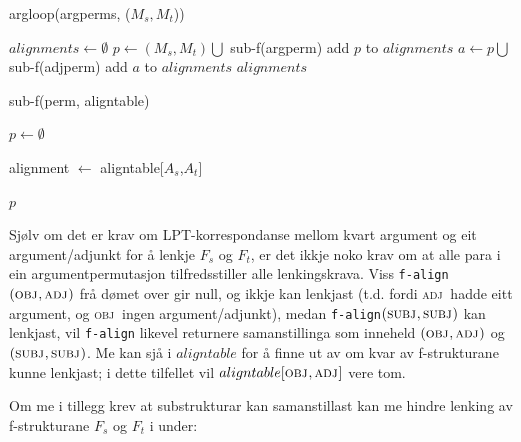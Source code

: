 \documentclass[12pt,a4paper,oneside,draft]{report}
\newcommand{\F}[2]{\textsc{#1}\ensuremath{_{#2}}}
\newcommand{\OBJ}{\F{obj}{}}
\newcommand{\OBJs}{\F{obj~}{}}
\newcommand{\ADJ}{\F{adj}{}}
\newcommand{\ADJs}{\F{adj~}{}}
\newcommand{\SUBJ}{\F{subj}{}}
\begin{document}
  \begin{algorithm}[htbp]
    \caption{argloop(argperms, ($M_s,M_t$))}
    \label{algo:argloop}

    $alignments \gets \emptyset$  \;
     {
       {
        $p \gets (M_s,M_t) \bigcup$ sub-f(argperm)
        add $p$ to $alignments$ \;
         {
          $a \gets p \bigcup$ sub-f(adjperm)  
          add $a$ to $alignments$\;
        } %
      } %
    }
    \Return $alignments$
  \end{algorithm}    
  
  \begin{algorithm}[htbp]
    \caption{sub-f(perm, aligntable)}
    \label{algo:sub-f}
    
    $p \gets \emptyset$  \;
         {
           {
            alignment $\gets$ aligntable[$A_s$,$A_t$] \;
          }
          
        }
    \Return $p$
  \end{algorithm}    

Sjølv om det er krav om LPT\hyp{}korrespondanse mellom kvart argument og
eit argument/adjunkt for å lenkje $F_s$ og $F_t$, er det ikkje noko
krav om at alle para i ein argumentpermutasjon tilfredsstiller alle
lenkingskrava. Viss \texttt{f-align}$(\OBJ,\ADJ)$ frå dømet over gir
null, og ikkje kan lenkjast (t.d. fordi \ADJs hadde eitt argument, og
\OBJs ingen argument/adjunkt), medan \texttt{f-align}$(\SUBJ,\SUBJ)$
kan lenkjast, vil \texttt{f-align} likevel returnere samanstillinga som
inneheld $(\OBJ,\ADJ)$ og $(\SUBJ,\SUBJ)$. Me kan sjå i $aligntable$
for å finne ut av om kvar av f\hyp{}strukturane kunne lenkjast; i dette
tilfellet vil $aligntable[\OBJ,\ADJ]$ vere tom.



Om me i tillegg krev at substrukturar kan samanstillast kan me
 hindre lenking av f\hyp{}strukturane $F_s$ og $F_t$ i \Next under:
\end{document}
